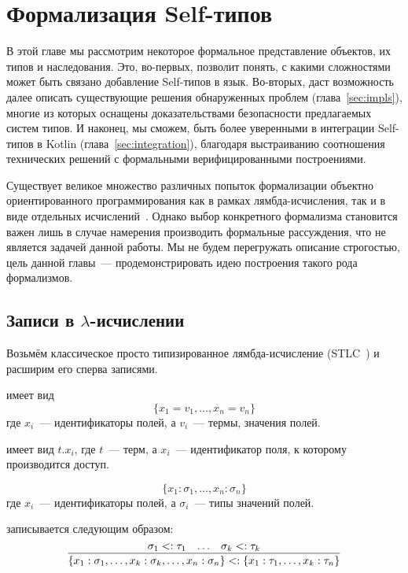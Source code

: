 \section{Формализация Self-типов} \label{sec:theory}

В этой главе мы рассмотрим некоторое формальное представление объектов, их типов и наследования.
Это, во-первых, позволит понять, с какими сложностями может быть связано добавление Self-типов в язык.
Во-вторых, даст возможность далее описать существующие решения обнаруженных проблем (глава~\ref{sec:impls}), многие из которых оснащены доказательствами безопасности предлагаемых систем типов.
И наконец, мы сможем, быть более уверенными в интеграции Self-типов в Kotlin (глава~\ref{sec:integration}), благодаря выстраиванию соотношения технических решений с формальными верифицированными построениями.

Существует великое множество различных попыток формализации объектно ориентированного программирования как в рамках лямбда-исчисления, так и в виде отдельных исчислений~\cite{pierce2002types}.
Однако выбор конкретного формализма становится важен лишь в случае намерения производить формальные рассуждения, что не является задачей данной работы.
Мы не будем перегружать описание строгостью, цель данной главы~--- продемонстрировать идею построения такого рода формализмов.


\subsection{Записи в $\lambda$-исчислении} \label{subsec:records}

Возьмём классическое просто типизированное лямбда-исчисление (STLC~\cite{pierce2002types}) и расширим его сперва записями.

 имеет вид \[\{x_1 = v_1,\ldots,x_n = v_n\}\] где $x_i$~--- идентификаторы полей, а $v_i$~--- термы, значения полей.

 имеет вид $t.x_i$, где $t$~--- терм, а $x_i$~--- идентификатор поля, к которому производится доступ.

 \[\{x_1 : \sigma_1,\ldots,x_n : \sigma_n\}\] где $x_i$~--- идентификаторы полей, а $\sigma_i$~--- типы значений полей.

 записывается следующим образом:
\[
    \infer{
        \{x_1 : \sigma_1, \ldots, x_k : \sigma_k, \ldots, x_n : \sigma_n\}
        <:
        \{x_1 : \tau_1, \ldots, x_k : \tau_n\}
    }{\sigma_1 <: \tau_1 & \ldots & \sigma_k <: \tau_k}
\]

